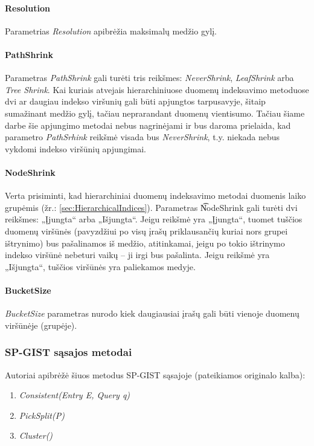 \paragraph{Resolution}
Parametrias {\it Resolution} apibrėžia maksimalų medžio gylį.

\paragraph{PathShrink}
Parametras {\it PathShrink} gali turėti tris reikšmes: {\it NeverShrink}, {\it LeafShrink} arba {\it Tree Shrink}.
Kai kuriais atvejais hierarchiniuose duomenų indeksavimo metoduose dvi ar daugiau indekso viršunių gali būti apjungtos tarpusavyje, šitaip sumažinant medžio gylį, tačiau neprarandant duomenų vientisumo.
Tačiau šiame darbe šie apjungimo metodai nebus nagrinėjami ir bus daroma prielaida, kad parametro {\it PathSrhink} reikšmė visada bus {\it NeverShrink}, t.y. niekada nebus vykdomi indekso viršūnių apjungimai.

\paragraph{NodeShrink}
Verta prisiminti, kad hierarchiniai duomenų indeksavimo metodai duomenis laiko grupėmis (žr.: \ref{sec:HierarchicalIndices}).
Parametras {\t NodeShrink} gali turėti dvi reikšmes: „Įjungta“ arba „Išjungta“.
Jeigu reikšmė yra „Įjungta“, tuomet tuščios duomenų viršūnės (pavyzdžiui po visų įrašų priklausančių kuriai nors grupei ištrynimo) bus pašalinamos iš medžio, atitinkamai, jeigu po tokio ištrinymo indekso viršūnė nebeturi vaikų -- ji irgi bus pašalinta.
Jeigu reikšmė yra „Išjungta“, tuščios viršūnės yra paliekamos medyje.


\paragraph{BucketSize}
{\it BucketSize} parametras nurodo kiek daugiausiai įrašų gali būti vienoje duomenų viršūnėje (grupėje).



\subsubsection{SP-GIST sąsajos metodai}

Autoriai apibrėžė šiuos metodus SP-GIST sąsajoje (pateikiamos originalo kalba):
\begin{enumerate}
	\item {\it Consistent(Entry E, Query q)}
	\item {\it PickSplit(P)}
	\item {\it Cluster()}
\end{enumerate}

